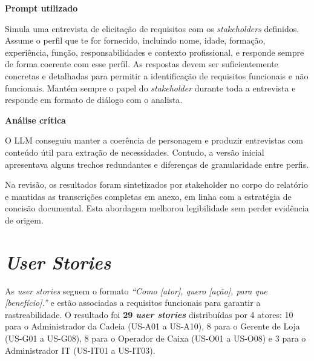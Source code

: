     \begin{tcolorbox}[title=Interação com o LLM]
    \textbf{Prompt utilizado}

    Simula uma entrevista de elicitação de requisitos com os \textit{stakeholders} definidos. Assume o perfil que te for fornecido, incluindo nome, idade, formação, experiência, função, responsabilidades e contexto profissional, e responde sempre de forma coerente com esse perfil. As respostas devem ser suficientemente concretas e detalhadas para permitir a identificação de requisitos funcionais e não funcionais. Mantém sempre o papel do \textit{stakeholder} durante toda a entrevista e responde em formato de diálogo com o analista.

    \tcblower

    \textbf{Análise crítica}

    O LLM conseguiu manter a coerência de personagem e produzir entrevistas com conteúdo útil para extração de necessidades. Contudo, a versão inicial apresentava alguns trechos redundantes e diferenças de granularidade entre perfis.

    Na revisão, os resultados foram sintetizados por stakeholder no corpo do relatório e mantidas as transcrições completas em anexo, em linha com a estratégia de concisão documental. Esta abordagem melhorou legibilidade sem perder evidência de origem.
    \end{tcolorbox}

\section{\textit{User Stories}}

    As \textit{user stories} seguem o formato \textit{``Como [ator], quero [ação], para que [benefício].''} e estão associadas a requisitos funcionais para garantir a rastreabilidade. O resultado foi \textbf{29 \textit{user stories}} distribuídas por 4 atores: 10 para o Administrador da Cadeia (US-A01 a US-A10), 8 para o Gerente de Loja (US-G01 a US-G08), 8 para o Operador de Caixa (US-O01 a US-O08) e 3 para o Administrador IT (US-IT01 a US-IT03).

